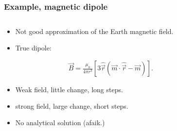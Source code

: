 \documentclass{beamer}
\begin{document}
\begin{frame}
\frametitle{Example, magnetic dipole}

\begin{columns}
\begin{column}{0.5\linewidth}
\begin{itemize}

\item <1- > Not good approximation of the Earth magnetic field.

\item <1-> True dipole:

\begin{align*}
\vec{B} = \frac{\mu_0}{4\pi r^3} \left[3 \hat{\vec{r}}(\vec{m}\cdot\hat{\vec{r}} -\vec{m}) \right].
\end{align*}

\item <2-> Weak field, little change, long steps.

\item <3-> strong field, large change, short steps.

\item <4-> No analytical solution (afaik.)


\end{itemize}
\end{column}
\begin{column}{0.5\linewidth}



\end{column}
\end{columns}
\end{frame}
\end{document}
